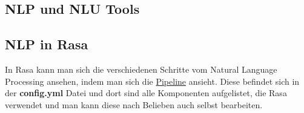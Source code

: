 \subsection{NLP und NLU Tools}


\subsection{NLP in Rasa}

In Rasa kann man sich die verschiedenen Schritte vom Natural Language Processing ansehen, indem man sich die \hyperref[sec:pipeline]{Pipeline} ansieht.
Diese befindet sich in der \textbf{config.yml} Datei und dort sind alle Komponenten aufgelistet, die Rasa verwendet und man kann diese nach Belieben auch selbst bearbeiten.